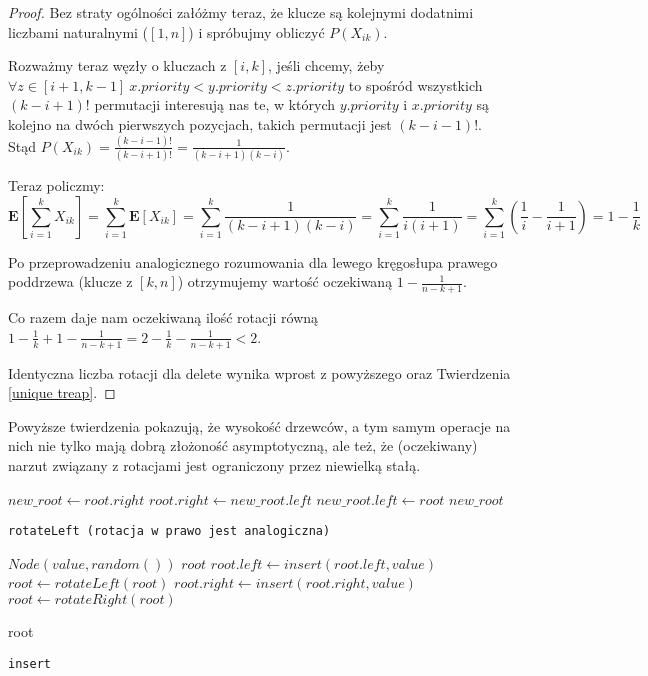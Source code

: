 \begin{proof}
Bez straty ogólności załóżmy teraz, że klucze są kolejnymi dodatnimi liczbami naturalnymi ($[1,n]$) i spróbujmy obliczyć $P(X_{ik})$.

Rozważmy teraz węzły o kluczach z $[i, k]$, jeśli chcemy, żeby $\forall z\in[i+1,k-1]\ x.priority < y.priority < z.priority$ to spośród wszystkich $(k-i+1)!$ permutacji interesują nas te, w których $y.priority$ i $x.priority$ są kolejno na dwóch pierwszych pozycjach, takich permutacji jest  $(k-i-1)!$.
Stąd $P(X_{ik}) = \frac{(k -i - 1)!}{(k -i + 1)!} =  \frac{1}{(k-i+1)(k-i)}$.

Teraz policzmy:
$$
\mathbf{E}[\sum_{i=1}^{k}X_{ik}]=
\sum_{i=1}^{k}\mathbf{E}[X_{ik}]=
\sum_{i=1}^{k}\frac{1}{(k-i+1)(k-i)}=
\sum_{i=1}^{k}\frac{1}{i(i+1)}=
\sum_{i=1}^{k}(\frac{1}{i}-\frac{1}{i+1})=
1-\frac{1}{k}
$$

Po przeprowadzeniu analogicznego rozumowania dla lewego kręgosłupa prawego poddrzewa (klucze z $[k,n]$) otrzymujemy wartość oczekiwaną $1 - \frac{1}{n-k+1}$.

Co razem daje nam oczekiwaną ilość rotacji równą $1 - \frac{1}{k} + 1 - \frac{1}{n-k+1} = 2 -  \frac{1}{k} - \frac{1}{n-k+1} < 2$.

Identyczna liczba rotacji dla delete wynika wprost z powyższego oraz Twierdzenia \ref{unique treap}.
\end{proof}

Powyższe twierdzenia pokazują, że wysokość drzewców, a tym samym operacje na nich nie tylko mają dobrą złożoność asymptotyczną, ale też, że (oczekiwany) narzut związany z rotacjami jest ograniczony przez niewielką stałą.

\begin{algorithm}
  \DontPrintSemicolon


  $new\_root \leftarrow root.right$\;
  $root.right \leftarrow new\_root.left$\;
  $new\_root.left \leftarrow root$\;
  \Return $new\_root$\;
  
  \caption{\texttt{rotateLeft (rotacja w prawo jest analogiczna)}}
  \label{treap-rotate-left}
\end{algorithm}

\begin{algorithm}
  \DontPrintSemicolon

  {
    \Return $Node(value, random())$\;
  }
  {
    \Return $root$\;
  }
  {
    $root.left \leftarrow insert(root.left, value)$\;
    {
      $root \leftarrow rotateLeft(root)$\;
    }
  }
  {
    $root.right \leftarrow insert(root.right, value)$\;
    {
      $root \leftarrow rotateRight(root)$\;
    }
  }
  
  \Return root\;
  \caption{\texttt{insert}}
  \label{treap-insert}
\end{algorithm}

